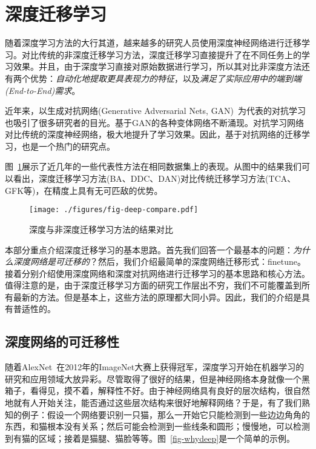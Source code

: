 \newpage
\section{深度迁移学习}

随着深度学习方法的大行其道，越来越多的研究人员使用深度神经网络进行迁移学习。对比传统的非深度迁移学习方法，深度迁移学习直接提升了在不同任务上的学习效果。并且，由于深度学习直接对原始数据进行学习，所以其对比非深度方法还有两个优势：\textit{自动化地提取更具表现力的特征}，以及\textit{满足了实际应用中的端到端(End-to-End)需求}。

近年来，以生成对抗网络(Generative Adversarial Nets, GAN)~\cite{goodfellow2014generative}为代表的对抗学习也吸引了很多研究者的目光。基于GAN的各种变体网络不断涌现。对抗学习网络对比传统的深度神经网络，极大地提升了学习效果。因此，基于对抗网络的迁移学习，也是一个热门的研究点。

图~\ref{fig-deep}展示了近几年的一些代表性方法在相同数据集上的表现。从图中的结果我们可以看出，深度迁移学习方法(BA、DDC、DAN)对比传统迁移学习方法(TCA、GFK等)，在精度上具有无可匹敌的优势。

\begin{figure}[htbp]
	\centering
	\texttt{[image: ./figures/fig-deep-compare.pdf]}
	\caption{深度与非深度迁移学习方法的结果对比}
	\label{fig-deep}
\end{figure}

本部分重点介绍深度迁移学习的基本思路。首先我们回答一个最基本的问题：\textit{为什么深度网络是可迁移的}？然后，我们介绍最简单的深度网络迁移形式：finetune。接着分别介绍使用深度网络和深度对抗网络进行迁移学习的基本思路和核心方法。值得注意的是，由于深度迁移学习方面的研究工作层出不穷，我们不可能覆盖到所有最新的方法。但是基本上，这些方法的原理都大同小异。因此，我们的介绍是具有普适性的。

\subsection{深度网络的可迁移性}
随着AlexNet~\cite{krizhevsky2012imagenet}在2012年的ImageNet大赛上获得冠军，深度学习开始在机器学习的研究和应用领域大放异彩。尽管取得了很好的结果，但是神经网络本身就像一个黑箱子，看得见，摸不着，解释性不好。由于神经网络具有良好的层次结构，很自然地就有人开始关注，能否通过这些层次结构来很好地解释网络？于是，有了我们熟知的例子：假设一个网络要识别一只猫，那么一开始它只能检测到一些边边角角的东西，和猫根本没有关系；然后可能会检测到一些线条和圆形；慢慢地，可以检测到有猫的区域；接着是猫腿、猫脸等等。图~\ref{fig-whydeep}是一个简单的示例。


